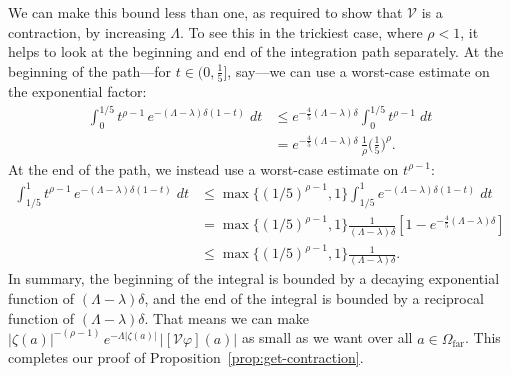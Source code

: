 \documentclass{article}
\theoremstyle{definition}
\theoremstyle{plain}
\newcommand{\volterra}{\mathcal{V}}
\newcommand{\far}{\Omega_\text{far}}
\begin{document}
We can make this bound less than one, as required to show that $\volterra$ is a contraction, by increasing $\Lambda$. To see this in the trickiest case, where $\rho < 1$, it helps to look at the beginning and end of the integration path separately. At the beginning of the path---for $t \in \big(0, \tfrac{1}{5}\big]$, say---we can use a worst-case estimate on the exponential factor:
\begin{align*}
\int_0^{1/5} t^{\rho-1}\,e^{-(\Lambda - \lambda)\delta(1 - t)}\;dt & \le e^{-\frac{4}{5}(\Lambda -\lambda)\delta} \int_0^{1/5} t^{\rho-1}\;dt \\
& = e^{-\frac{4}{5}(\Lambda - \lambda)\delta}\,\tfrac{1}{\rho} \big(\tfrac{1}{5}\big)^\rho.
\end{align*}
At the end of the path, we instead use a worst-case estimate on $t^{\rho-1}$:
\begin{align*}
\int_{1/5}^1 t^{\rho-1}\,e^{-(\Lambda - \lambda)\delta(1 - t)}\;dt & \le \max\{(1/5)^{\rho-1}, 1\} \int_{1/5}^1 e^{-(\Lambda - \lambda)\delta(1 - t)}\;dt \\
& = \max\{(1/5)^{\rho-1}, 1\} \frac{1}{(\Lambda - \lambda)\delta}\left[ 1 - e^{-\tfrac{4}{5}(\Lambda - \lambda)\delta} \right] \\
& \le \max\{(1/5)^{\rho-1}, 1\} \frac{1}{(\Lambda - \lambda)\delta}.
\end{align*}
In summary, the beginning of the integral is bounded by a decaying exponential function of $(\Lambda - \lambda)\delta$, and the end of the integral is bounded by a reciprocal function of $(\Lambda - \lambda)\delta$. That means we can make $|\zeta(a)|^{-(\rho-1)}\,e^{-\Lambda|\zeta(a)|}\,|[\volterra\varphi](a)|$ as small as we want over all $a \in \far$. This completes our proof of Proposition~\ref{prop:get-contraction}.
\end{document}
